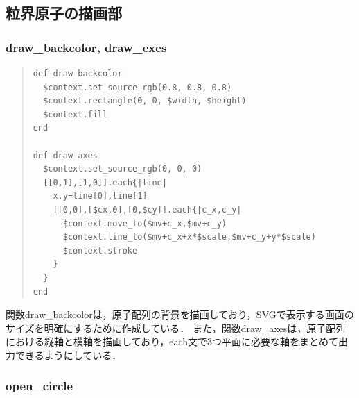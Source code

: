 \subsection{粒界原子の描画部}
\subsubsection{draw\_backcolor, draw\_exes}\begin{quote}\begin{verbatim}
def draw_backcolor
  $context.set_source_rgb(0.8, 0.8, 0.8)
  $context.rectangle(0, 0, $width, $height)
  $context.fill
end

def draw_axes
  $context.set_source_rgb(0, 0, 0)
  [[0,1],[1,0]].each{|line|
    x,y=line[0],line[1]
    [[0,0],[$cx,0],[0,$cy]].each{|c_x,c_y|
      $context.move_to($mv+c_x,$mv+c_y)
      $context.line_to($mv+c_x+x*$scale,$mv+c_y+y*$scale)
      $context.stroke
    }
  }
end
\end{verbatim}\end{quote}
関数draw\_backcolorは，原子配列の背景を描画しており，SVGで表示する画面のサイズを明確にするために作成している．
また，関数draw\_axesは，原子配列における縦軸と横軸を描画しており，each文で3つ平面に必要な軸をまとめて出力できるようにしている．

\subsubsection{open\_circle}
